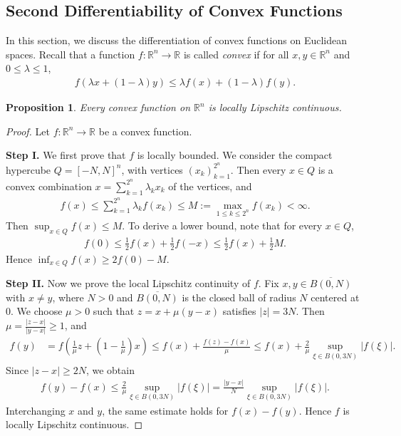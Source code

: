 \documentclass{article}
\numberwithin{equation}{section}
\newcommand{\bbR}{\mathbb{R}}
\newcommand{\ol}{\overline}
\theoremstyle{plain}
\newtheorem{proposition}[theorem]{Proposition}
\theoremstyle{definition}
\begin{document}
\subsection{Second Differentiability of Convex Functions}
In this section, we discuss the differentiation of convex functions on Euclidean spaces. Recall that a function $f:\bbR^n\to\bbR$ is called \textit{convex} if for all $x,y\in\bbR^n$ and $0\leq\lambda\leq 1$,
\begin{align*}
	f(\lambda x+(1-\lambda)y)\leq \lambda f(x)+(1-\lambda)f(y).
\end{align*}
\begin{proposition}\label{convexloclip}
Every convex function on $\bbR^n$ is locally Lipschitz continuous.
\end{proposition}
\begin{proof}
Let $f:\bbR^n\to\bbR$ be a convex function.
\item\textbf{Step I.} We first prove that $f$ is locally bounded. We consider the compact hypercube $Q=[-N,N]^n$, with vertices $(x_k)_{k=1}^{2^n}$. Then every $x\in Q$ is a convex combination $x=\sum_{k=1}^{2^n}\lambda_kx_k$ of the vertices, and
\begin{align*}
	f(x)\leq\sum_{k=1}^{2^n}\lambda_kf(x_k)\leq M:=\max_{1\leq k\leq 2^n}f(x_k)<\infty.
\end{align*}
Then $\sup_{x\in Q}f(x)\leq M$. To derive a lower bound, note that for every $x\in Q$,
\begin{align*}
	f(0)\leq\frac{1}{2}f(x)+\frac{1}{2}f(-x)\leq\frac{1}{2}f(x)+\frac{1}{2}M.
\end{align*}
Hence $\inf_{x\in Q}f(x)\geq 2f(0)-M$.

\item\textbf{Step II.} Now we prove the local Lipschitz continuity of $f$. Fix $x,y\in\ol{B(0,N)}$ with $x\neq y$, where $N>0$ and $\ol{B(0,N)}$ is the closed ball of radius $N$ centered at $0$. We choose $\mu>0$ such that $z=x+\mu(y-x)$ satisfies $\vert z\vert=3N$. Then $\mu=\frac{\vert z-x\vert}{\vert y-x\vert}\geq 1$, and
\begin{align*}
	f(y)&=f\left(\frac{1}{\mu}z+\left(1-\frac{1}{\mu}\right)x\right)\leq f(x)+\frac{f(z)-f(x)}{\mu}\leq f(x)+\frac{2}{\mu}\sup_{\xi\in B(0,3N)}\vert f(\xi)\vert.
\end{align*}
Since $\vert z-x\vert\geq 2N$, we obtain
\begin{align*}
	f(y)-f(x)\leq\frac{2}{\mu}\sup_{\xi\in B(0,3N)}\vert f(\xi)\vert=\frac{\vert y-x\vert}{N}\sup_{\xi\in B(0,3N)}\vert f(\xi)\vert.
\end{align*}
Interchanging $x$ and $y$, the same estimate holds for $f(x)-f(y)$. Hence $f$ is locally Lipschitz continuous.
\end{proof}
\end{document}
